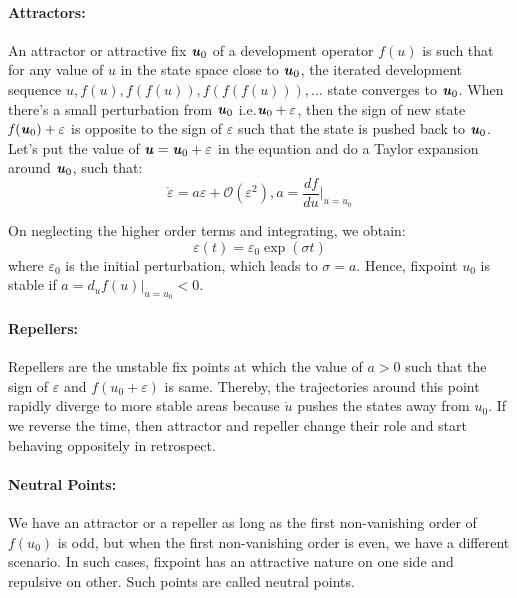 \paragraph{Attractors:} An attractor or attractive fix $ \textbf{\textit{u}}_{0} $ of a development operator $\textit{f}(\textit{u})$ is such that for any value of $\textit{u}$ in the state space close to $\textbf{\textit{u}}_{0} $, the iterated development sequence $ \textit{u},\textit{f}(u),\textit{f}(\textit{f}(u)),\textit{f}(\textit{f}(\textit{f}(u))),\ldots $ state converges to $\textbf{\textit{u}}_{0}$. When there’s a small perturbation from $\textbf{\textit{u}}_{0}$ i.e.$\textbf{\textit{u}}_{0}+\varepsilon $, then the sign of new state $ \textit{f}\left(\textbf{\textit{u}}_{0} \right)+\varepsilon $ is opposite to the sign of  $ \varepsilon $ such that the state is pushed back to $\textbf{\textit{u}}_{0} $. Let’s put the value of $\textbf{\textit{u}}= \textbf{\textit{u}}_{0} +\varepsilon $ in the equation     and do a Taylor expansion around $\textbf{\textit{u}}_{0}$, such that:
\begin{equation}
\dot{\varepsilon} = \textit{a}\varepsilon + \mathcal{O}{\left(\varepsilon^{2}\right) }, \textit{a} = \dfrac{d\textit{f}}{d\textit{u}}\vert_{\textit{u}=\textit{u}_{0}}
\end{equation}

On neglecting the higher order terms and integrating, we obtain:
\begin{equation}
\varepsilon(\textit{t})=\varepsilon_{0} \exp (\sigma\textit{t})
\end{equation}
where $ \varepsilon_{0} $ is the initial perturbation, which leads to $ \sigma=\textit{a} $. Hence, fixpoint $\textit{u}_{0}$ is stable if $\textit{a}= d_{\textit{u}}\textit{f}(\textit{u})\vert_{\textit{u}=\textit{u}_{0}} < 0$.

\paragraph{Repellers:} Repellers are the unstable fix points at which the value of $\textit{a}>0$ such that the sign of $\varepsilon$ and $\textit{f}(\textit{u}_{0}+\varepsilon)$ is same. Thereby, the trajectories around this point rapidly diverge to more stable areas because $ \dot{\textit{u}} $ pushes the states away from $\textit{u}_{0}$.
If we reverse the time, then attractor and repeller change their role and start behaving oppositely in retrospect.

\paragraph{Neutral Points:} We have an attractor or a repeller as long as the first non-vanishing order of $\textit{f}(\textit{u}_{0})$ is odd, but when the first non-vanishing order is even, we have a different scenario. In such cases, fixpoint has an attractive nature on one side and repulsive on other. Such points are called neutral points.

